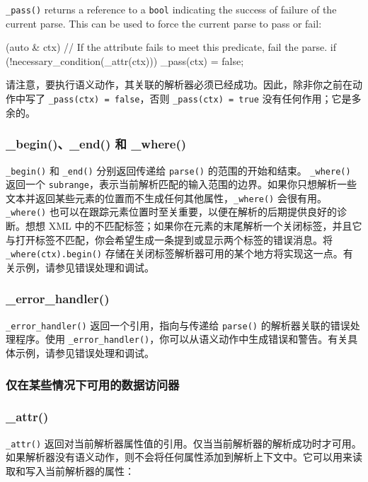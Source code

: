 \texttt{\_pass()} returns a reference to a \texttt{bool} indicating the success of failure of the current parse. This can be used to force the current parse to pass or fail:

\begin{code}
[](auto & ctx) {
    // If the attribute fails to meet this predicate, fail the parse.
    if (!necessary_condition(_attr(ctx)))
        _pass(ctx) = false;
}
\end{code}

请注意，要执行语义动作，其关联的解析器必须已经成功。因此，除非你之前在动作中写了 \texttt{\_pass(ctx) = false}，否则 \texttt{\_pass(ctx) = true} 没有任何作用；它是多余的。

\subsubsection{\_begin()、\_end() 和 \_where()}

\texttt{\_begin()} 和 \texttt{\_end()} 分别返回传递给 \texttt{parse()} 的范围的开始和结束。 \texttt{\_where()} 返回一个 \texttt{subrange}，表示当前解析匹配的输入范围的边界。如果你只想解析一些文本并返回某些元素的位置而不生成任何其他属性，\texttt{\_where()} 会很有用。 \texttt{\_where()} 也可以在跟踪元素位置时至关重要，以便在解析的后期提供良好的诊断。想想 XML 中的不匹配标签；如果你在元素的末尾解析一个关闭标签，并且它与打开标签不匹配，你会希望生成一条提到或显示两个标签的错误消息。将 \texttt{\_where(ctx).begin()} 存储在关闭标签解析器可用的某个地方将实现这一点。有关示例，请参见错误处理和调试。

\subsubsection{\_error\_handler()}

\texttt{\_error\_handler()} 返回一个引用，指向与传递给 \texttt{parse()} 的解析器关联的错误处理程序。使用 \texttt{\_error\_handler()}，你可以从语义动作中生成错误和警告。有关具体示例，请参见错误处理和调试。

\subsubsection{仅在某些情况下可用的数据访问器}

\subsubsection{\_attr()}

\texttt{\_attr()} 返回对当前解析器属性值的引用。仅当当前解析器的解析成功时才可用。如果解析器没有语义动作，则不会将任何属性添加到解析上下文中。它可以用来读取和写入当前解析器的属性：


